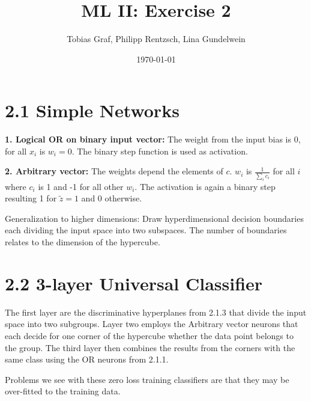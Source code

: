 \documentclass{article}
\title{ML II:  Exercise 2} %
\author{Tobias Graf, Philipp Rentzsch, Lina Gundelwein} %
\date{\today} %
\begin{document}
\maketitle 
\section*{2.1 Simple Networks}
\textbf{1. Logical OR on binary input vector:} The weight from the input bias is 0, for all $x_i$ is $w_i = 0$. The binary step function is used as activation.
\begin{figure}[htb]
\def\svgwidth{\textwidth}
 
\end{figure}

\textbf{2. Arbitrary vector:} The weights depend the elements of $c$. $w_i$ is $\frac{1}{\sum_{i}c_i}$ for all $i$ where $c_i$ is 1 and -1 for all other $w_i$. The activation is again a binary step resulting 1 for $\tilde{z} = 1$ and 0 otherwise.

\begin{figure}[htb]
	\def\svgwidth{\textwidth}
	 
\end{figure}

\newpage

\begin{figure}[htb!]
\def\svgwidth{\textwidth}
 
\end{figure}
Generalization to higher dimensions: Draw hyperdimensional decision boundaries each dividing the input space into two subspaces. The number of boundaries relates to the dimension of the hypercube.

\section*{2.2 3-layer Universal Classifier}

The first layer are the discriminative hyperplanes from 2.1.3 that divide the input space into two subgroups. Layer two employs the Arbitrary vector neurons that each decide for one corner of the hypercube whether the data point belongs to the group. The third layer then combines the results from the corners with the same class using the OR neurons from 2.1.1.

\begin{figure}[htb!]
	\def\svgwidth{\textwidth}
	 
\end{figure}

Problems we see with these zero loss training classifiers are that they may be over-fitted to the training data.
\end{document}

